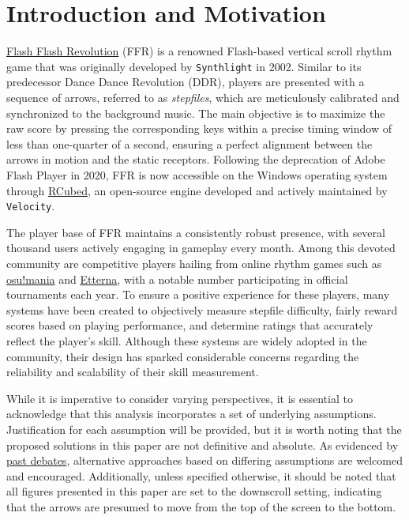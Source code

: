 \section{Introduction and Motivation}
\label{sec:introduction}

\href{https://www.Flash Flash Revolution.com/}{Flash Flash Revolution} (FFR) is a renowned Flash-based vertical scroll rhythm game that was originally developed by \texttt{Synthlight} in 2002. Similar to its predecessor Dance Dance Revolution (DDR), players are presented with a sequence of arrows, referred to as \textit{stepfiles}, which are meticulously calibrated and synchronized to the background music. The main objective is to maximize the raw score by pressing the corresponding keys within a precise timing window of less than one-quarter of a second, ensuring a perfect alignment between the arrows in motion and the static receptors. Following the deprecation of Adobe Flash Player in 2020, FFR is now accessible on the Windows operating system through \href{https://www.flashflashrevolution.com/ffr/r3-goes-open-source/}{RCubed}, an open-source engine developed and actively maintained by \texttt{Velocity}.

\vspace{2mm}

The player base of FFR maintains a consistently robust presence, with several thousand users actively engaging in gameplay every month. Among this devoted community are competitive players hailing from online rhythm games such as \href{https://osu.ppy.sh/}{osu!mania} and \href{https://etternaonline.com/}{Etterna}, with a notable number participating in official tournaments each year. To ensure a positive experience for these players, many systems have been created to objectively measure stepfile difficulty, fairly reward scores based on playing performance, and determine ratings that accurately reflect the player's skill. Although these systems are widely adopted in the community, their design has sparked considerable concerns regarding the reliability and scalability of their skill measurement.

\vspace{2mm}

While it is imperative to consider varying perspectives, it is essential to acknowledge that this analysis incorporates a set of underlying assumptions. Justification for each assumption will be provided, but it is worth noting that the proposed solutions in this paper are not definitive and absolute. As evidenced by \href{https://www.flashflashrevolution.com/vbz/showthread.php?t=153119}{past debates}, alternative approaches based on differing assumptions are welcomed and encouraged. Additionally, unless specified otherwise, it should be noted that all figures presented in this paper are set to the downscroll setting, indicating that the arrows are presumed to move from the top of the screen to the bottom.

